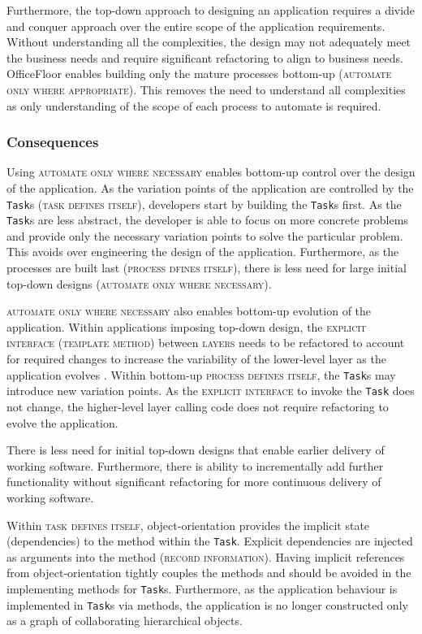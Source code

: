 \documentclass[prodmode]{style/acmlarge}
\begin{document}
Furthermore, the top-down approach to designing an application requires a divide
and conquer approach over the entire scope of the application requirements.
Without understanding all the complexities, the design may not adequately meet
the business needs and require significant refactoring to align to business
needs.  OfficeFloor enables building only the mature processes bottom-up
(\textsc{automate only where appropriate}).  This removes the need to understand
all complexities as only understanding of the scope of each process to automate
is required.


\subsubsection*{Consequences}

Using \textsc{automate only where necessary} enables bottom-up control over the
design of the application.  As the variation points of the application are
controlled by the \texttt{Task}s (\textsc{task defines itself}), developers
start by building the \texttt{Task}s first.  As the \texttt{Task}s are less
abstract, the developer is able to focus on more concrete problems and provide
only the necessary variation points to solve the particular problem.  This
avoids over engineering the design of the application.  Furthermore, as the
processes are built last (\textsc{process dfines itself}), there is less need
for large initial top-down designs (\textsc{automate only where necessary}).

\textsc{automate only where necessary} also enables bottom-up evolution of the
application.  Within applications imposing top-down design, the
\textsc{explicit interface} (\textsc{template method}) between \textsc{layers}
needs to be refactored to account for required changes to increase the
variability of the lower-level layer as the application evolves \cite{ioc}.
Within bottom-up \textsc{process defines itself}, the \texttt{Task}s may
introduce new variation points.  As the \textsc{explicit interface} to invoke
the \texttt{Task} does not change, the higher-level layer calling code does not
require refactoring to evolve the application.

There is less need for initial top-down designs that enable earlier delivery of
working software.  Furthermore, there is ability to incrementally add further
functionality without significant refactoring for more continuous delivery of
working software.

Within \textsc{task defines itself}, object-orientation provides the implicit
state (dependencies) to the method within the \texttt{Task}.  Explicit
dependencies are injected as arguments into the method (\textsc{record
information}).  Having implicit references from object-orientation tightly
couples the methods and should be avoided in the implementing methods for
\texttt{Task}s.  Furthermore, as the application behaviour is implemented in
\texttt{Task}s via methods, the application is no longer constructed only as a
graph of collaborating hierarchical objects.
\end{document}
